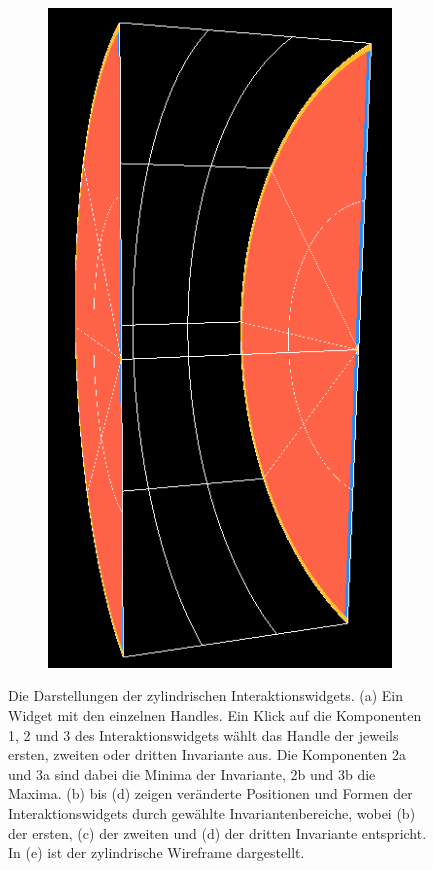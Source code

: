 \documentclass[a4paper,fontsize=12pt,toc=bib,parskip=half,ngerman]{scrartcl}
\begin{document}
\begin{figure}
\begin{subfigure}{0.15\textwidth}
		\includegraphics[width=\textwidth]{pictures/InteractionPlanes5.png}
		\subcaption{}
		\label{InteractionPlaneE}
	\end{subfigure}
	\hspace*{\fill}
	\caption{Die Darstellungen der zylindrischen Interaktionswidgets. (a) Ein Widget mit den einzelnen Handles. Ein Klick auf die Komponenten 1, 2 und 3 des Interaktionswidgets w\"ahlt das Handle der jeweils ersten, zweiten oder dritten Invariante aus. Die Komponenten 2a und 3a sind dabei die Minima der Invariante, 2b und 3b die Maxima. (b) bis (d) zeigen ver\"anderte Positionen und Formen der Interaktionswidgets durch gew\"ahlte Invariantenbereiche, wobei (b) der ersten, (c) der zweiten und (d) der dritten Invariante entspricht. In (e) ist der zylindrische Wireframe dargestellt.}
\end{figure}
\end{document}

